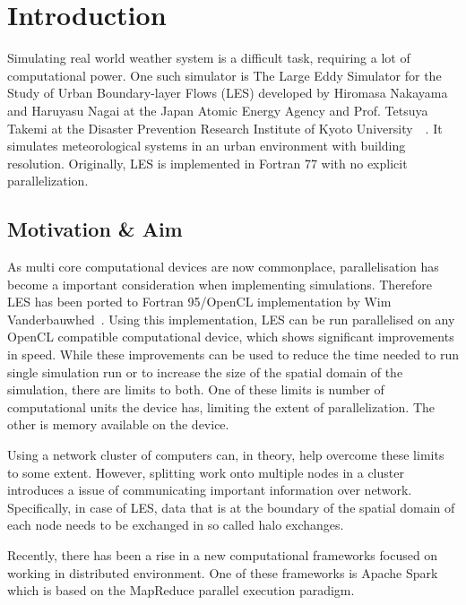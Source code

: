 \documentclass{l4proj}
\begin{document}
\chapter{Introduction}

Simulating real world weather system is a difficult task, requiring a lot of computational power.
One such simulator is The Large Eddy Simulator for the Study of Urban Boundary-layer Flows (LES)
developed by  Hiromasa Nakayama and Haruyasu Nagai at the Japan Atomic Energy Agency
and Prof. Tetsuya Takemi at the Disaster Prevention Research Institute of Kyoto University~\cite{les_analysis}~\cite{les}.
It simulates meteorological systems in an urban environment with building resolution.
Originally, LES is implemented in Fortran 77 with no explicit parallelization.

\section{Motivation \& Aim}

As multi core computational devices are now commonplace, parallelisation has become
a important consideration when implementing simulations. Therefore LES has been
ported to Fortran 95/OpenCL implementation by Wim Vanderbauwhed~\cite{les_wim}. Using this implementation,
LES can be run parallelised on any OpenCL compatible computational device, which shows
significant improvements in speed. While these improvements can be used to reduce the time needed to
run single simulation run or to increase the size of the spatial domain of the simulation,
there are limits to both. One of these limits is number of computational units the device has,
limiting the extent of parallelization. The other is memory available on the device.

Using a network cluster of computers can, in theory, help overcome these limits to some extent.
However, splitting work onto multiple nodes in a cluster introduces a issue of communicating
important information over network. Specifically, in case of LES, data that is at the boundary of
the spatial domain of each node needs to be exchanged in so called halo exchanges.

Recently, there has been a rise in a new computational frameworks focused on working in
distributed environment. One of these frameworks is Apache Spark which is based on
the MapReduce parallel execution paradigm.
\end{document}

